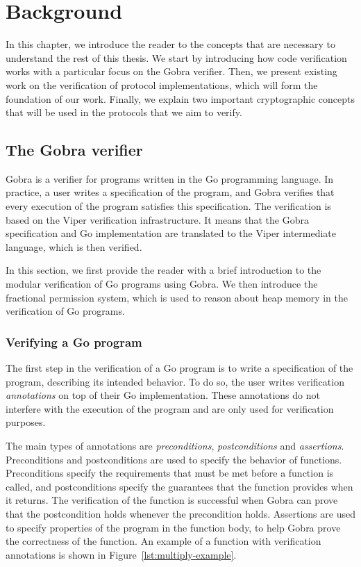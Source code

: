 \chapter{Background}
\label{chap:background}

In this chapter, we introduce the reader to the concepts that are necessary to understand the rest of this thesis.
We start by introducing how code verification works with a particular focus on the Gobra verifier.
Then, we present existing work on the verification of protocol implementations, which will form the foundation of our work.
Finally, we explain two important cryptographic concepts that will be used in the protocols that we aim to verify.

\section{The Gobra verifier}
\label{sec:the-gobra-verifier}

Gobra is a verifier for programs written in the Go programming language.
In practice, a user writes a specification of the program, and Gobra verifies that every execution of the program satisfies this specification.
The verification is based on the Viper verification infrastructure. It means that the Gobra specification and Go implementation are translated to the Viper intermediate language, which is then verified.

In this section, we first provide the reader with a brief introduction to the modular verification of Go programs using Gobra.
We then introduce the fractional permission system, which is used to reason about heap memory in the verification of Go programs.

\subsection{Verifying a Go program}
\label{sec:verifying-a-go-program}

The first step in the verification of a Go program is to write a specification of the program, describing its intended behavior.
To do so, the user writes verification \emph{annotations} on top of their Go implementation.
These annotations do not interfere with the execution of the program and are only used for verification purposes.

The main types of annotations are \emph{preconditions}, \emph{postconditions} and \emph{assertions}.
Preconditions and postconditions are used to specify the behavior of functions. Preconditions specify the requirements that must be met before a function is called, and postconditions specify the guarantees that the function provides when it returns.
The verification of the function is successful when Gobra can prove that the postcondition holds whenever the precondition holds.
Assertions are used to specify properties of the program in the function body, to help Gobra prove the correctness of the function.
An example of a function with verification annotations is shown in Figure~\ref{lst:multiply-example}.

